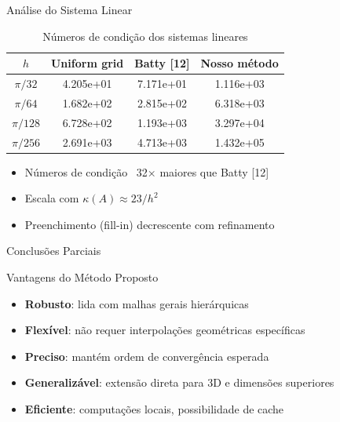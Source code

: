 \documentclass[../main/main.tex]{subfiles}
\begin{document}
\begin{frame}{Análise do Sistema Linear}
\begin{table}
\centering
\caption{Números de condição dos sistemas lineares}
\begin{tabular}{cccc}
\toprule
$h$ & Uniform grid & Batty [12] & Nosso método \\
\midrule
$\pi/32$ & 4.205e+01 & 7.171e+01 & 1.116e+03 \\
$\pi/64$ & 1.682e+02 & 2.815e+02 & 6.318e+03 \\
$\pi/128$ & 6.728e+02 & 1.193e+03 & 3.297e+04 \\
$\pi/256$ & 2.691e+03 & 4.713e+03 & 1.432e+05 \\
\bottomrule
\end{tabular}
\end{table}

\begin{itemize}
\item Números de condição ~32× maiores que Batty [12]
\item Escala com $\kappa(A) \approx 23/h^2$
\item Preenchimento (fill-in) decrescente com refinamento
\end{itemize}
\end{frame}

\begin{frame}{Conclusões Parciais}
\begin{block}{Vantagens do Método Proposto}
\begin{itemize}
\item \textbf{Robusto}: lida com malhas gerais hierárquicas
\item \textbf{Flexível}: não requer interpolações geométricas específicas
\item \textbf{Preciso}: mantém ordem de convergência esperada
\item \textbf{Generalizável}: extensão direta para 3D e dimensões superiores
\item \textbf{Eficiente}: computações locais, possibilidade de cache
\end{itemize}
\end{block}
\end{frame}
\end{document}

